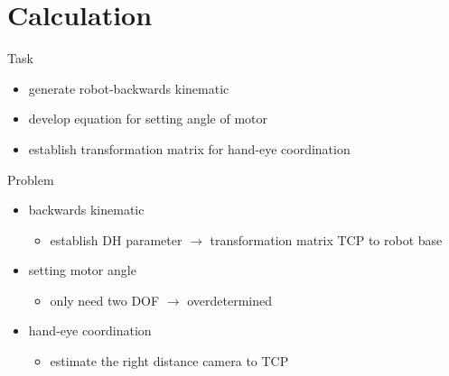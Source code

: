 \documentclass{beamer}
\begin{document}
\section{Calculation}
\frame{\tableofcontents[currentsection]}

\begin{frame}{Task}

\begin{itemize}
	\item generate robot-backwards kinematic \\
	\item develop equation for setting angle of motor \\
	\item establish transformation matrix for hand-eye coordination \\
\end{itemize}

\end{frame}

\begin{frame}{Problem}

\begin{itemize}
	\item backwards kinematic
	\begin{itemize}
		\item establish DH parameter $\rightarrow$ transformation matrix TCP to robot base
	\end{itemize}
	\item setting motor angle
	\begin{itemize}
		\item only need two DOF $\rightarrow$ overdetermined
	\end{itemize}
	\item hand-eye coordination
	\begin{itemize}
		\item estimate the right distance camera to TCP
	\end{itemize}
\end{itemize}

\end{frame}
\end{document}
